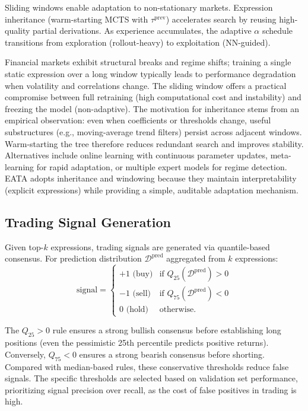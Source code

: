 Sliding windows enable adaptation to non-stationary markets. Expression inheritance (warm-starting MCTS with $\tau^{\text{prev}}$) accelerates search by reusing high-quality partial derivations. As experience accumulates, the adaptive $\alpha$ schedule transitions from exploration (rollout-heavy) to exploitation (NN-guided).

Financial markets exhibit structural breaks and regime shifts; training a single static expression over a long window typically leads to performance degradation when volatility and correlations change. The sliding window offers a practical compromise between full retraining (high computational cost and instability) and freezing the model (non-adaptive). The motivation for inheritance stems from an empirical observation: even when coefficients or thresholds change, useful substructures (e.g., moving-average trend filters) persist across adjacent windows. Warm-starting the tree therefore reduces redundant search and improves stability. Alternatives include online learning with continuous parameter updates, meta-learning for rapid adaptation, or multiple expert models for regime detection. EATA adopts inheritance and windowing because they maintain interpretability (explicit expressions) while providing a simple, auditable adaptation mechanism.
\subsection{Trading Signal Generation}
\label{subsec:signal}

Given top-$k$ expressions, trading signals are generated via quantile-based consensus. For prediction distribution $\mathcal{D}^{\text{pred}}$ aggregated from $k$ expressions:
\begin{equation}
\text{signal} = \begin{cases}
+1 \text{ (buy)} & \text{if } Q_{25}(\mathcal{D}^{\text{pred}}) > 0 \\
-1 \text{ (sell)} & \text{if } Q_{75}(\mathcal{D}^{\text{pred}}) < 0 \\
0 \text{ (hold)} & \text{otherwise}.
\end{cases}
\label{eq:signal}
\end{equation}

The $Q_{25} > 0$ rule ensures a strong bullish consensus before establishing long positions (even the pessimistic 25th percentile predicts positive returns). Conversely, $Q_{75} < 0$ ensures a strong bearish consensus before shorting. Compared with median-based rules, these conservative thresholds reduce false signals. The specific thresholds are selected based on validation set performance, prioritizing signal precision over recall, as the cost of false positives in trading is high.

